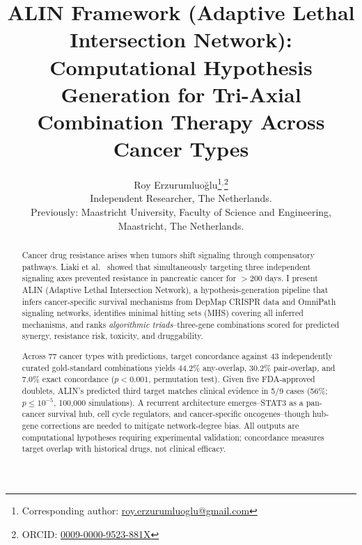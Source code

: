 \documentclass[times, twoside, watermark]{zHenriquesLab-StyleBioRxiv}
\providecommand{\shorttitle}[1]{}
\providecommand{\shorttitle}[1]{}
\begin{document}
\title{ALIN Framework (Adaptive Lethal Intersection Network): Computational Hypothesis Generation for Tri-Axial Combination Therapy Across Cancer Types}
\shorttitle{ALIN Framework}

\author{Roy Erzurumluoğlu\thanks{Corresponding author: \href{mailto:roy.erzurumluoglu@gmail.com}{roy.erzurumluoglu@gmail.com}}$^{,}$\thanks{ORCID: \href{https://orcid.org/0009-0000-9523-881X}{0009-0000-9523-881X}}\\
  Independent Researcher, The Netherlands.\\
  {\small Previously: Maastricht University, Faculty of Science and Engineering, Maastricht, The Netherlands.}}

\maketitle

\begin{abstract}
Cancer drug resistance arises when tumors shift signaling through compensatory pathways. Liaki et al.~\cite{Liaki2025} showed that simultaneously targeting three independent signaling axes prevented resistance in pancreatic cancer for $>$200 days. I present ALIN (Adaptive Lethal Intersection Network), a hypothesis-generation pipeline that infers cancer-specific survival mechanisms from DepMap CRISPR data and OmniPath signaling networks, identifies minimal hitting sets (MHS) covering all inferred mechanisms, and ranks \emph{algorithmic triads}--three-gene combinations scored for predicted synergy, resistance risk, toxicity, and druggability.

Across 77 cancer types with predictions, target concordance against 43 independently curated gold-standard combinations yields 44.2\% any-overlap, 30.2\% pair-overlap, and 7.0\% exact concordance ($p < 0.001$, permutation test). Given five FDA-approved doublets, ALIN's predicted third target matches clinical evidence in 5/9 cases (56\%; $p \leq 10^{-5}$, 100{,}000 simulations). A recurrent architecture emerges--STAT3 as a pan-cancer survival hub, cell cycle regulators, and cancer-specific oncogenes--though hub-gene corrections are needed to mitigate network-degree bias. All outputs are computational hypotheses requiring experimental validation; concordance measures target overlap with historical drugs, not clinical efficacy.
\end{abstract}
\end{document}
